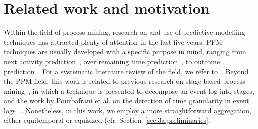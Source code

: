 \section{Related work and motivation}\label{sec:2:motivation}
Within the field of process mining, research on and use of predictive modelling techniques has attracted plenty of attention in the last five years. PPM techniques are usually developed with a specific purpose in mind, ranging from next activity prediction~\cite{evermann2017predicting,DBLP:conf/caise/TaxVRD17}, over remaining time prediction~\cite{verenich2019survey}, to outcome prediction~\cite{kratsch2020machine}. For a systematic literature review of the field, we refer to~\cite{neu2021systematic}. Beyond the PPM field, this work is related to previous research on stage-based process mining~\cite{nguyen2016business}, in which a technique is presented to decompose an event log into stages, and the work by Pourbafrani et al. on the detection of time granularity in event logs ~\cite{pourbafrani2020}. Nonetheless, in this work, we employ a more straightforward aggregation, either equitemporal or equisized (cfr. Section~\ref{sec:3a:preliminaries}. 


